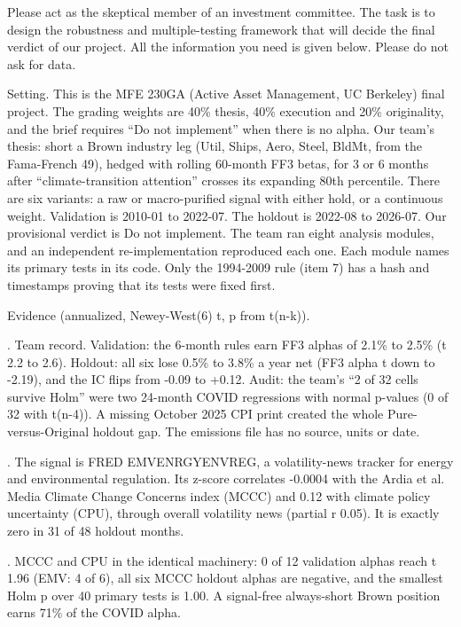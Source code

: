 \par\noindent Please act as the skeptical member of an investment committee. The task is to design the robustness and multiple-testing framework that will decide the final verdict of our project. All the information you need is given below. Please do not ask for data.
\medskip
\par\noindent Setting. This is the MFE 230GA (Active Asset Management, UC Berkeley) final project. The grading weights are 40\% thesis, 40\% execution and 20\% originality, and the brief requires ``Do not implement'' when there is no alpha. Our team's thesis: short a Brown industry leg (Util, Ships, Aero, Steel, BldMt, from the Fama-French 49), hedged with rolling 60-month FF3 betas, for 3 or 6 months after ``climate-transition attention'' crosses its expanding 80th percentile. There are six variants: a raw or macro-purified signal with either hold, or a continuous weight. Validation is 2010-01 to 2022-07. The holdout is 2022-08 to 2026-07. Our provisional verdict is Do not implement. The team ran eight analysis modules, and an independent re-implementation reproduced each one. Each module names its primary tests in its code. Only the 1994-2009 rule (item 7) has a hash and timestamps proving that its tests were fixed first.
\medskip
\par\noindent Evidence (annualized, Newey-West(6) t, p from t(n-k)).
\par{}. Team record. Validation: the 6-month rules earn FF3 alphas of 2.1\% to 2.5\% (t 2.2 to 2.6). Holdout: all six lose 0.5\% to 3.8\% a year net (FF3 alpha t down to -2.19), and the IC flips from -0.09 to +0.12. Audit: the team's ``2 of 32 cells survive Holm'' were two 24-month COVID regressions with normal p-values (0 of 32 with t(n-4)). A missing October 2025 CPI print created the whole Pure-versus-Original holdout gap. The emissions file has no source, units or date.
\par{}. The signal is FRED EMVENRGYENVREG, a volatility-news tracker for energy and environmental regulation. Its z-score correlates -0.0004 with the Ardia et al. Media Climate Change Concerns index (MCCC) and 0.12 with climate policy uncertainty (CPU), through overall volatility news (partial r 0.05). It is exactly zero in 31 of 48 holdout months.
\par{}. MCCC and CPU in the identical machinery: 0 of 12 validation alphas reach t 1.96 (EMV: 4 of 6), all six MCCC holdout alphas are negative, and the smallest Holm p over 40 primary tests is 1.00. A signal-free always-short Brown position earns 71\% of the COVID alpha.
